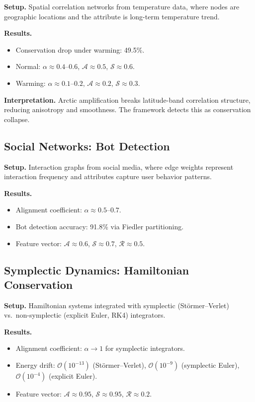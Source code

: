 \documentclass[12pt,letterpaper]{article}
\newcommand{\cA}{\mathcal{A}}
\newcommand{\cS}{\mathcal{S}}
\newcommand{\cR}{\mathcal{R}}
\newcommand{\cO}{\mathcal{O}}
\begin{document}
\textbf{Setup.} Spatial correlation networks from temperature data, where nodes are geographic locations and the attribute is long-term temperature trend.

\textbf{Results.}
\begin{itemize}
  \item Conservation drop under warming: 49.5\%.
  \item Normal: $\alpha \approx 0.4$--$0.6$, $\cA \approx 0.5$, $\cS \approx 0.6$.
  \item Warming: $\alpha \approx 0.1$--$0.2$, $\cA \approx 0.2$, $\cS \approx 0.3$.
\end{itemize}

\textbf{Interpretation.} Arctic amplification breaks latitude-band correlation structure, reducing anisotropy and smoothness. The framework detects this as conservation collapse.

\subsection{Social Networks: Bot Detection}

\textbf{Setup.} Interaction graphs from social media, where edge weights represent interaction frequency and attributes capture user behavior patterns.

\textbf{Results.}
\begin{itemize}
  \item Alignment coefficient: $\alpha \approx 0.5$--$0.7$.
  \item Bot detection accuracy: 91.8\% via Fiedler partitioning.
  \item Feature vector: $\cA \approx 0.6$, $\cS \approx 0.7$, $\cR \approx 0.5$.
\end{itemize}

\subsection{Symplectic Dynamics: Hamiltonian Conservation}

\textbf{Setup.} Hamiltonian systems integrated with symplectic (St\"ormer--Verlet) vs.\ non-symplectic (explicit Euler, RK4) integrators.

\textbf{Results.}
\begin{itemize}
  \item Alignment coefficient: $\alpha \to 1$ for symplectic integrators.
  \item Energy drift: $\cO(10^{-13})$ (St\"ormer--Verlet), $\cO(10^{-9})$ (symplectic Euler), $\cO(10^{-4})$ (explicit Euler).
  \item Feature vector: $\cA \approx 0.95$, $\cS \approx 0.95$, $\cR \approx 0.2$.
\end{itemize}
\end{document}

